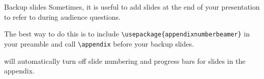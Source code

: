 \begin{frame}[fragile]{Backup slides}
    Sometimes, it is useful to add slides at the end of your presentation to refer to during audience questions.

    The best way to do this is to include \verb|\usepackage{appendixnumberbeamer}| in your preamble and call \verb|\appendix| before your backup slides.

    \themename{} will automatically turn off slide numbering and progress bars for slides in the appendix.
\end{frame}